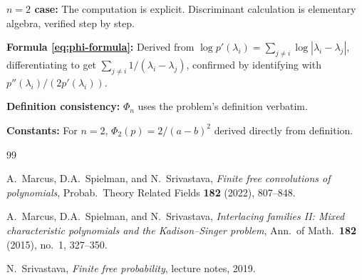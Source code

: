 \documentclass[12pt]{article}
\begin{document}
\textbf{$n=2$ case:} The computation is explicit. Discriminant calculation is elementary algebra, verified step by step.

\textbf{Formula \eqref{eq:phi-formula}:} Derived from $\log p'(\lambda_i) = \sum_{j\neq i} \log|\lambda_i - \lambda_j|$, differentiating to get $\sum_{j\neq i} 1/(\lambda_i - \lambda_j)$, confirmed by identifying with $p''(\lambda_i)/(2p'(\lambda_i))$.

\textbf{Definition consistency:} $\Phi_n$ uses the problem's definition verbatim.

\textbf{Constants:} For $n=2$, $\Phi_2(p) = 2/(a-b)^2$ derived directly from definition.

\begin{thebibliography}{99}

A.\ Marcus, D.A.\ Spielman, and N.\ Srivastava,
\textit{Finite free convolutions of polynomials},
Probab.\ Theory Related Fields \textbf{182} (2022), 807--848.

A.\ Marcus, D.A.\ Spielman, and N.\ Srivastava,
\textit{Interlacing families II: Mixed characteristic polynomials and the Kadison--Singer problem},
Ann.\ of Math.\ \textbf{182} (2015), no.\ 1, 327--350.

N.\ Srivastava,
\textit{Finite free probability},
lecture notes, 2019.

\end{thebibliography}
\end{document}
